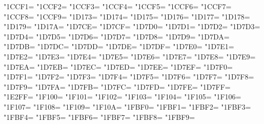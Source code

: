 \XeTeXcharclass"1CCF1=\KclassNum
\XeTeXcharclass"1CCF2=\KclassNum
\XeTeXcharclass"1CCF3=\KclassNum
\XeTeXcharclass"1CCF4=\KclassNum
\XeTeXcharclass"1CCF5=\KclassNum
\XeTeXcharclass"1CCF6=\KclassNum
\XeTeXcharclass"1CCF7=\KclassNum
\XeTeXcharclass"1CCF8=\KclassNum
\XeTeXcharclass"1CCF9=\KclassNum
\XeTeXcharclass"1D173=\KclassNum
\XeTeXcharclass"1D174=\KclassNum
\XeTeXcharclass"1D175=\KclassNum
\XeTeXcharclass"1D176=\KclassNum
\XeTeXcharclass"1D177=\KclassNum
\XeTeXcharclass"1D178=\KclassNum
\XeTeXcharclass"1D179=\KclassNum
\XeTeXcharclass"1D17A=\KclassNum
\XeTeXcharclass"1D7CE=\KclassNum
\XeTeXcharclass"1D7CF=\KclassNum
\XeTeXcharclass"1D7D0=\KclassNum
\XeTeXcharclass"1D7D1=\KclassNum
\XeTeXcharclass"1D7D2=\KclassNum
\XeTeXcharclass"1D7D3=\KclassNum
\XeTeXcharclass"1D7D4=\KclassNum
\XeTeXcharclass"1D7D5=\KclassNum
\XeTeXcharclass"1D7D6=\KclassNum
\XeTeXcharclass"1D7D7=\KclassNum
\XeTeXcharclass"1D7D8=\KclassNum
\XeTeXcharclass"1D7D9=\KclassNum
\XeTeXcharclass"1D7DA=\KclassNum
\XeTeXcharclass"1D7DB=\KclassNum
\XeTeXcharclass"1D7DC=\KclassNum
\XeTeXcharclass"1D7DD=\KclassNum
\XeTeXcharclass"1D7DE=\KclassNum
\XeTeXcharclass"1D7DF=\KclassNum
\XeTeXcharclass"1D7E0=\KclassNum
\XeTeXcharclass"1D7E1=\KclassNum
\XeTeXcharclass"1D7E2=\KclassNum
\XeTeXcharclass"1D7E3=\KclassNum
\XeTeXcharclass"1D7E4=\KclassNum
\XeTeXcharclass"1D7E5=\KclassNum
\XeTeXcharclass"1D7E6=\KclassNum
\XeTeXcharclass"1D7E7=\KclassNum
\XeTeXcharclass"1D7E8=\KclassNum
\XeTeXcharclass"1D7E9=\KclassNum
\XeTeXcharclass"1D7EA=\KclassNum
\XeTeXcharclass"1D7EB=\KclassNum
\XeTeXcharclass"1D7EC=\KclassNum
\XeTeXcharclass"1D7ED=\KclassNum
\XeTeXcharclass"1D7EE=\KclassNum
\XeTeXcharclass"1D7EF=\KclassNum
\XeTeXcharclass"1D7F0=\KclassNum
\XeTeXcharclass"1D7F1=\KclassNum
\XeTeXcharclass"1D7F2=\KclassNum
\XeTeXcharclass"1D7F3=\KclassNum
\XeTeXcharclass"1D7F4=\KclassNum
\XeTeXcharclass"1D7F5=\KclassNum
\XeTeXcharclass"1D7F6=\KclassNum
\XeTeXcharclass"1D7F7=\KclassNum
\XeTeXcharclass"1D7F8=\KclassNum
\XeTeXcharclass"1D7F9=\KclassNum
\XeTeXcharclass"1D7FA=\KclassNum
\XeTeXcharclass"1D7FB=\KclassNum
\XeTeXcharclass"1D7FC=\KclassNum
\XeTeXcharclass"1D7FD=\KclassNum
\XeTeXcharclass"1D7FE=\KclassNum
\XeTeXcharclass"1D7FF=\KclassNum
\XeTeXcharclass"1E2FF=\KclassNum
\XeTeXcharclass"1F100=\KclassNum
\XeTeXcharclass"1F101=\KclassNum
\XeTeXcharclass"1F102=\KclassNum
\XeTeXcharclass"1F103=\KclassNum
\XeTeXcharclass"1F104=\KclassNum
\XeTeXcharclass"1F105=\KclassNum
\XeTeXcharclass"1F106=\KclassNum
\XeTeXcharclass"1F107=\KclassNum
\XeTeXcharclass"1F108=\KclassNum
\XeTeXcharclass"1F109=\KclassNum
\XeTeXcharclass"1F10A=\KclassNum
\XeTeXcharclass"1FBF0=\KclassNum
\XeTeXcharclass"1FBF1=\KclassNum
\XeTeXcharclass"1FBF2=\KclassNum
\XeTeXcharclass"1FBF3=\KclassNum
\XeTeXcharclass"1FBF4=\KclassNum
\XeTeXcharclass"1FBF5=\KclassNum
\XeTeXcharclass"1FBF6=\KclassNum
\XeTeXcharclass"1FBF7=\KclassNum
\XeTeXcharclass"1FBF8=\KclassNum
\XeTeXcharclass"1FBF9=\KclassNum

